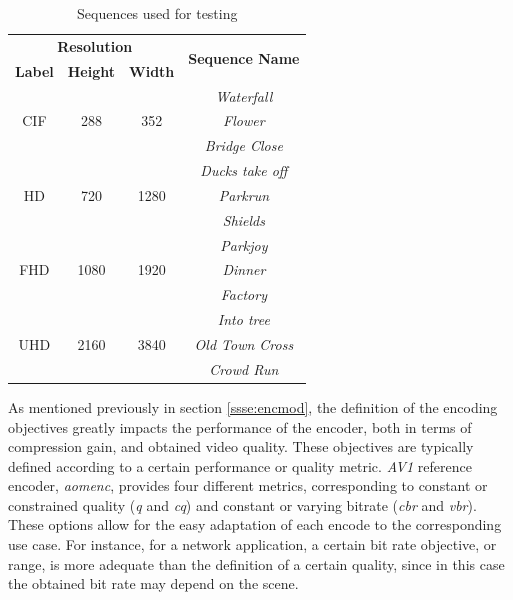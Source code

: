 \begin{table}[htpb]
    \centering
    \begin{tabular}{cccc} \toprule
        \multicolumn{3}{c}{\textbf{Resolution}}                                 & \multirow{2}{*}{\textbf{Sequence Name}} \\
        \textbf{Label}          & \textbf{Height}       & \textbf{Width}        & \\ \toprule 
        \multirow{3}{*}{CIF}    & \multirow{3}{*}{288}  & \multirow{3}{*}{352}  & \textit{Waterfall}\\
                                &                       &                       & \textit{Flower} \\
                                &                       &                       & \textit{Bridge Close} \\ \hline
        \multirow{3}{*}{HD}     & \multirow{3}{*}{720}  & \multirow{3}{*}{1280} & \textit{Ducks take off}\\
                                &                       &                       & \textit{Parkrun} \\        
                                &                       &                       & \textit{Shields} \\ \hline
        \multirow{3}{*}{FHD}    & \multirow{3}{*}{1080} & \multirow{3}{*}{1920} & \textit{Parkjoy}\\
                                &                       &                       & \textit{Dinner} \\
                                &                       &                       & \textit{Factory} \\ \hline
        \multirow{3}{*}{UHD}    & \multirow{3}{*}{2160} & \multirow{3}{*}{3840} & \textit{Into tree}\\
                                &                       &                       & \textit{Old Town Cross} \\
                                &                       &                       & \textit{Crowd Run} \\ 
        \bottomrule
    \end{tabular}
    \caption{Sequences used for testing}
    \label{tab:seqs}
\end{table}

As mentioned previously in section \ref{ssse:encmod}, the definition of the encoding objectives greatly impacts the performance of the encoder, both in terms of compression gain, and obtained video quality. These objectives are typically defined according to a certain performance or quality metric. \emph{AV1} reference encoder, \emph{aomenc}, provides four different metrics, corresponding to constant or constrained quality (\emph{q} and \emph{cq}) and constant or varying bitrate (\emph{cbr} and \emph{vbr}). These options allow for the easy adaptation of each encode to the corresponding use case. For instance, for a network application, a certain bit rate objective, or range, is more adequate than the definition of a certain quality, since in this case the obtained bit rate may depend on the scene.

